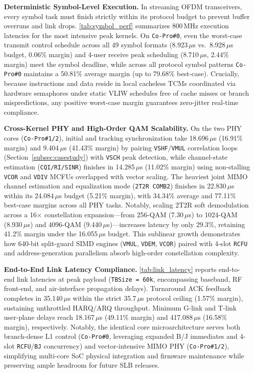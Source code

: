 \documentclass[9pt,conference]{IEEEtran}
\begin{document}
\textbf{Deterministic Symbol-Level Execution.}
In streaming OFDM transceivers, every symbol task must finish strictly within its protocol budget to prevent buffer overruns and link drops. \autoref{tab:symbol_perf} summarizes 800\,MHz execution latencies for the most intensive peak kernels. On \texttt{Co-Pro\#0}, even the worst-case transmit control schedule across all 49 symbol formats (8.923\,$\mu$s vs.\ 8.928\,$\mu$s budget, 0.06\% margin) and 4-user receive peak scheduling (8.710\,$\mu$s, 2.44\% margin) meet the symbol deadline, while across all protocol symbol patterns \texttt{Co-Pro\#0} maintains a 50.81\% average margin (up to 79.68\% best-case). Crucially, because instructions and data reside in local cacheless TCMs coordinated via hardware semaphores under static VLIW schedules free of cache misses or branch mispredictions, any positive worst-case margin guarantees zero-jitter real-time compliance.

\textbf{Cross-Kernel PHY and High-Order QAM Scalability.}
On the two PHY cores (\texttt{Co-Pro\#1/2}), initial and tracking synchronization take 18.696\,$\mu$s (16.91\% margin) and 9.404\,$\mu$s (41.43\% margin) by pairing \texttt{VSHF}/\texttt{VMUL} correlation loops (Section~\ref{subsec:casestudy}) with \texttt{VSCH} peak detection, while channel-state estimation (\texttt{CQI/RI/SINR}) finishes in 14.285\,$\mu$s (11.02\% margin) using non-stalling \texttt{VCOR} and \texttt{VDIV} MCFUs overlapped with vector scaling. The heaviest joint MIMO channel estimation and equalization mode (\texttt{2T2R COMB2}) finishes in 22.830\,$\mu$s within its 24.084\,$\mu$s budget (5.21\% margin), with 34.34\% average and 77.11\% best-case margins across all PHY tasks. Notably, scaling 2T2R soft demodulation across a 16$\times$ constellation expansion---from 256-QAM (7.30\,$\mu$s) to 1024-QAM (8.930\,$\mu$s) and 4096-QAM (9.440\,$\mu$s)---increases latency by only 29.3\%, retaining 41.2\% margin under the 16.055\,$\mu$s budget. This sublinear growth demonstrates how 640-bit split-guard SIMD engines (\texttt{VMUL}, \texttt{VDEM}, \texttt{VCOR}) paired with 4-slot \texttt{RCFU} and address-generation parallelism absorb high-order constellation complexity.

\textbf{End-to-End Link Latency Compliance.}
\autoref{tab:link_latency} reports end-to-end link latencies at peak payload (\texttt{TBSize = 60k}, encompassing baseband, RF front-end, and air-interface propagation delays). Turnaround ACK feedback completes in 35.140\,$\mu$s within the strict 35.7\,$\mu$s protocol ceiling (1.57\% margin), sustaining unthrottled HARQ/ARQ throughput. Minimum G-link and T-link user-plane delays reach 18.167\,$\mu$s (49.11\% margin) and 417.088\,$\mu$s (16.58\% margin), respectively. Notably, the identical core microarchitecture serves both branch-dense L1 control (\texttt{Co-Pro\#0}, leveraging expanded B/J immediates and 4-slot \texttt{RCFU}/\texttt{BJ} concurrency) and vector-intensive MIMO PHY (\texttt{Co-Pro\#1/2}), simplifying multi-core SoC physical integration and firmware maintenance while preserving ample headroom for future SLB releases.
\end{document}
